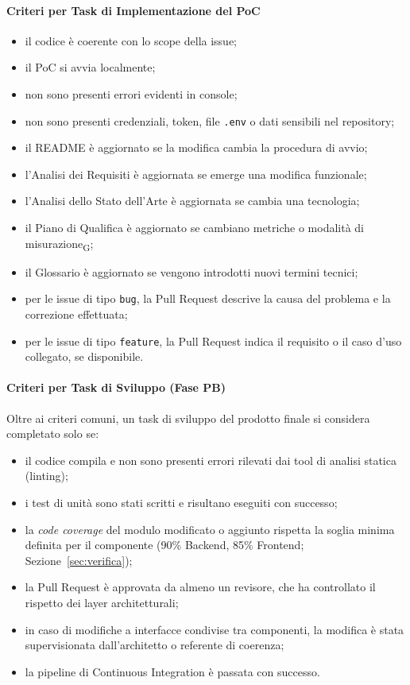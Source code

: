 \paragraph{Criteri per Task di Implementazione del PoC}

\begin{itemize}
    \item il codice è coerente con lo scope della issue;
    \item il PoC si avvia localmente;
    \item non sono presenti errori evidenti in console;
    \item non sono presenti credenziali, token, file \texttt{.env} o dati sensibili
    nel repository;
    \item il README è aggiornato se la modifica cambia la procedura di avvio;
    \item l'Analisi dei Requisiti è aggiornata se emerge una modifica funzionale;
    \item l'Analisi dello Stato dell'Arte è aggiornata se cambia una tecnologia;
    \item il Piano di Qualifica è aggiornato se cambiano metriche o modalità di
    misurazione\textsubscript{G};
    \item il Glossario è aggiornato se vengono introdotti nuovi termini tecnici;
    \item per le issue di tipo \texttt{bug}, la Pull Request descrive la causa del
    problema e la correzione effettuata;
    \item per le issue di tipo \texttt{feature}, la Pull Request indica il requisito
    o il caso d'uso collegato, se disponibile.
\end{itemize}

\paragraph{Criteri per Task di Sviluppo (Fase PB)}

Oltre ai criteri comuni, un task di sviluppo del prodotto finale si considera completato solo se:
\begin{itemize}
    \item il codice compila e non sono presenti errori rilevati dai tool di analisi statica (linting);
    \item i test di unità sono stati scritti e risultano eseguiti con successo;
    \item la \textit{code coverage} del modulo modificato o aggiunto rispetta la soglia minima definita per il componente (90\% Backend, 85\% Frontend; Sezione~\ref{sec:verifica});
    \item la Pull Request è approvata da almeno un revisore, che ha controllato il rispetto dei layer architetturali;
    \item in caso di modifiche a interfacce condivise tra componenti, la modifica è stata supervisionata dall'architetto o referente di coerenza;
    \item la pipeline di Continuous Integration è passata con successo.
\end{itemize}

